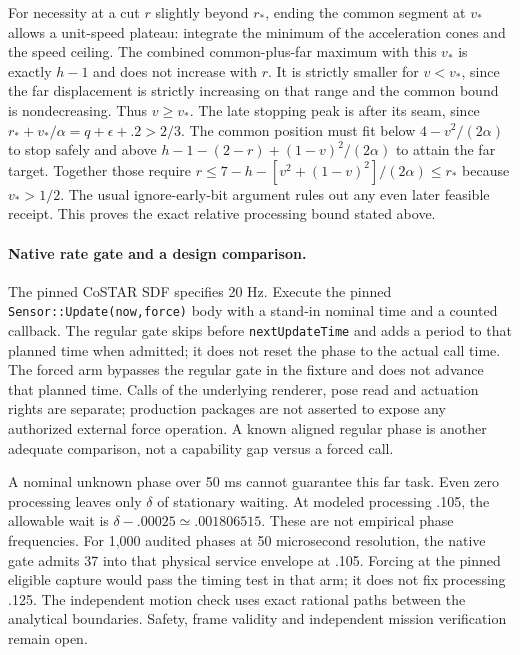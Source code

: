 \documentclass{article}
\begin{document}
For necessity at a cut $r$ slightly beyond $r_*$, ending the common
segment at $v_*$ allows a unit-speed plateau: integrate the minimum
of the acceleration cones and the speed ceiling. The combined
common-plus-far maximum with this $v_*$ is exactly $h-1$ and does
not increase with $r$. It is strictly smaller for $v<v_*$, since
the far displacement is strictly increasing on that range and the
common bound is nondecreasing. Thus $v\ge v_*$. The late stopping
peak is after its seam, since $r_*+v_*/\alpha=q+\epsilon+.2>2/3$.
The common position must fit below $4-v^2/(2\alpha)$ to stop safely
and above $h-1-(2-r)+(1-v)^2/(2\alpha)$ to attain the far target.
Together those require $r\le7-h-[v^2+(1-v)^2]/(2\alpha)\le r_*$
because $v_*>1/2$. The usual ignore-early-bit argument rules out
any even later feasible receipt. This proves the exact relative
processing bound stated above.

\paragraph{Native rate gate and a design comparison.}
The pinned CoSTAR SDF specifies 20 Hz. Execute the pinned
\texttt{Sensor::Update(now,force)} body with a stand-in nominal time
and a counted callback. The regular gate skips before
\texttt{nextUpdateTime} and adds a period to that planned time
when admitted; it does not reset the phase to the actual call
time. The forced arm bypasses the regular gate in the fixture
and does not advance that planned time. Calls of the underlying
renderer, pose read and actuation rights are separate; production
packages are not asserted to expose any authorized external force
operation. A known aligned regular phase is another adequate
comparison, not a capability gap versus a forced call.

A nominal unknown phase over 50 ms cannot guarantee this far task.
Even zero processing leaves only $\delta$ of stationary waiting.
At modeled processing .105, the allowable wait is
$\delta-.00025\simeq .001806515$. These are not empirical phase
frequencies. For 1,000 audited phases at 50 microsecond resolution,
the native gate admits 37 into that physical service envelope at
.105. Forcing at the pinned eligible capture would pass the timing
test in that arm; it does not fix processing .125. The independent
motion check uses exact rational paths between the analytical
boundaries. Safety, frame validity and independent mission
verification remain open.
\end{document}
